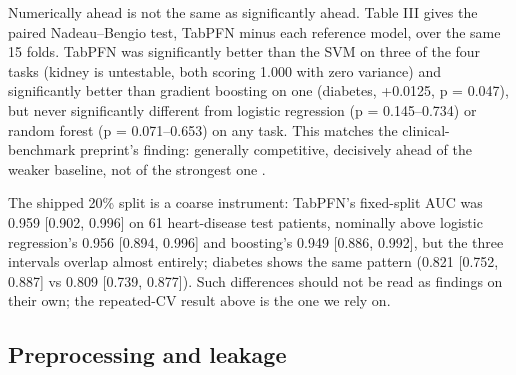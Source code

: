 \documentclass[conference]{IEEEtran}
\begin{document}
Numerically ahead is not the same as significantly ahead. Table III gives the paired Nadeau--Bengio test, TabPFN minus each reference model, over the same 15 folds. TabPFN was significantly better than the SVM on three of the four tasks (kidney is untestable, both scoring 1.000 with zero variance) and significantly better than gradient boosting on one (diabetes, +0.0125, p = 0.047), but never significantly different from logistic regression (p = 0.145--0.734) or random forest (p = 0.071--0.653) on any task. This matches the clinical-benchmark preprint's finding: generally competitive, decisively ahead of the weaker baseline, not of the strongest one \cite{clinbench2026}.

\begin{table}[!t]
\caption{TabPFN minus reference model, mean AUC difference and Nadeau--Bengio p (15 folds; kidney vs SVM has zero variance, no test defined).}
\label{tab:tabpfn-vs-ref}
\centering\footnotesize
{}
\end{table}

The shipped 20\% split is a coarse instrument: TabPFN's fixed-split AUC was 0.959 [0.902, 0.996] on 61 heart-disease test patients, nominally above logistic regression's 0.956 [0.894, 0.996] and boosting's 0.949 [0.886, 0.992], but the three intervals overlap almost entirely; diabetes shows the same pattern (0.821 [0.752, 0.887] vs 0.809 [0.739, 0.877]). Such differences should not be read as findings on their own; the repeated-CV result above is the one we rely on.

\subsection{Preprocessing and leakage}
\end{document}
